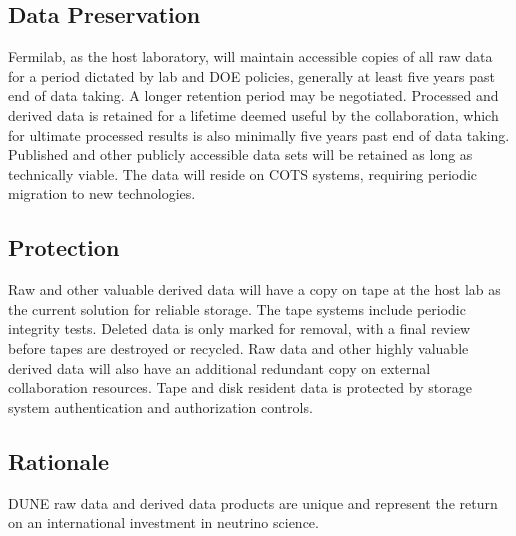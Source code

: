 \documentclass[../main-v1.tex]{subfiles}
\begin{document}
\subsection{Data Preservation}
Fermilab, as the host laboratory, will maintain accessible copies of all raw data for a period dictated by lab and DOE policies, generally at least five years past end of data taking.  A longer retention period may be negotiated.  Processed and derived data is retained for a lifetime deemed useful by the collaboration, which for ultimate processed results is also minimally five years past end of data taking.  Published and other publicly accessible data sets will be retained as long as technically viable. The data will reside on COTS systems, requiring periodic migration to new technologies.

\subsection{Protection}
Raw and other valuable derived data will have a copy on tape at the host lab as the current solution for reliable storage.  The tape systems include periodic integrity tests.  Deleted data is only marked for removal, with a final review before tapes are destroyed or recycled.  Raw data and other highly valuable derived data will also have an additional redundant copy on external collaboration resources.  Tape and disk resident data is protected by storage system authentication and authorization controls.

\subsection{Rationale}
DUNE raw data and derived data products are unique and represent the return on an international investment in neutrino science.

\end{document}

